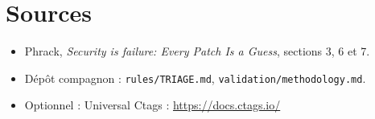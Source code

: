 \documentclass{training}
\begin{document}
\chapter{Sources}
\begin{itemize}
  \item Phrack, \emph{Security is failure: Every Patch Is a Guess},
        sections 3, 6 et 7.
  \item Dépôt compagnon : \texttt{rules/TRIAGE.md},
        \texttt{validation/methodology.md}.
  \item Optionnel : Universal Ctags : \url{https://docs.ctags.io/}
\end{itemize}

\end{document}
